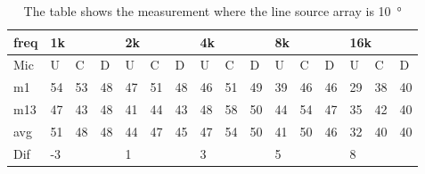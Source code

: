 \begin{table}[H]
\centering
\caption{The table shows the measurement where the line source array is \SI{10}{\degree}}
\begin{tabular}{l|l|l|l|l|l|l|l|l|l|l|l|l|lll}
freq & \multicolumn{3}{l|}{1k} & \multicolumn{3}{l|}{2k} & \multicolumn{3}{l|}{4k} & \multicolumn{3}{l|}{8k} & \multicolumn{3}{l}{16k}                                \\ \hline
Mic  & U      & C      & D     & U      & C      & D     & U      & C      & D     & U      & C      & D     & \multicolumn{1}{l|}{U}  & \multicolumn{1}{l|}{C}  & D  \\ \hline
m1   & 54     &  53    & 48    &  47    &   51   &  48   &  46    &  51    &   49  &  39    &  46    &  46   & \multicolumn{1}{l|}{29} & \multicolumn{1}{l|}{38} &  40\\ \hline
m13   &  47    &  43    & 48    & 41     &  44    &  43   &  48    &  58    & 50    & 44     &  54    &  47   & \multicolumn{1}{l|}{35} & \multicolumn{1}{l|}{42} &  40\\ \hline
avg & 51     & 48     & 48   &  44    & 47     &  45   &   47   & 54     &  50   &  41    &  50    & 46    & \multicolumn{1}{l|}{32} & \multicolumn{1}{l|}{40} & 40 \\ \hline 
Dif & \multicolumn{3}{l|}{-3} & \multicolumn{3}{l|}{1} & \multicolumn{3}{l|}{3} & \multicolumn{3}{l|}{5} & \multicolumn{3}{l}{8}                                
\end{tabular}
\end{table}


